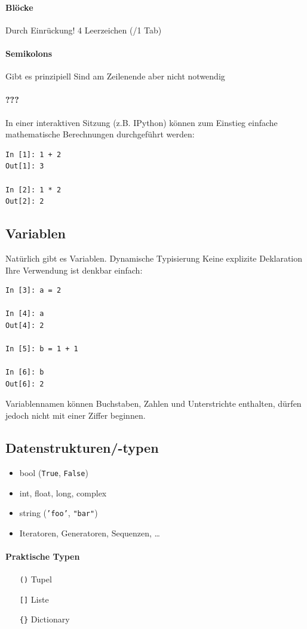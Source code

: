 \paragraph{Blöcke}
Durch Einrückung!
4 Leerzeichen (/1 Tab)

\paragraph{Semikolons}
Gibt es prinzipiell
Sind am Zeilenende aber nicht notwendig

\paragraph{???}
In einer interaktiven Sitzung (z.B. IPython) können zum Einstieg einfache mathematische Berechnungen durchgeführt werden:
\begin{verbatim}
In [1]: 1 + 2
Out[1]: 3

In [2]: 1 * 2
Out[2]: 2
\end{verbatim}

\subsection{Variablen}
Natürlich gibt es Variablen.
Dynamische Typisierung
Keine explizite Deklaration 
Ihre Verwendung ist denkbar einfach:
\begin{verbatim}
In [3]: a = 2

In [4]: a
Out[4]: 2

In [5]: b = 1 + 1

In [6]: b
Out[6]: 2
\end{verbatim}
Variablennamen können Buchstaben, Zahlen und Unterstrichte enthalten, dürfen jedoch nicht mit einer Ziffer beginnen.

\subsection{Datenstrukturen/-typen}
\begin{itemize}
  \item bool (\texttt{True}, \texttt{False})
  \item int, float, long, complex
  \item string (\texttt{'foo'}, \texttt{"bar"})
  \item Iteratoren, Generatoren, Sequenzen, …
\end{itemize}
\paragraph{Praktische Typen}
\begin{itemize}
  \item[\texttt{()}] Tupel
  \item[\texttt{[]}] Liste
  \item[\texttt{\{\}}] Dictionary 
\end{itemize}
